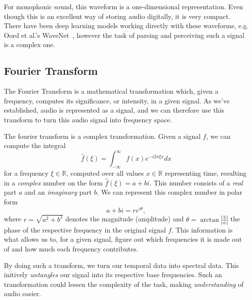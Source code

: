 For monophonic sound, this waveform is a one-dimensional representation. Even though this is an excellent way of storing audio digitally, it is very compact. There have been deep learning models working directly with these waveforms, e.g. Oord et al.'s WaveNet~\cite{oord2016wavenetgenerativemodelraw}, however the task of parsing and perceiving such a signal is a complex one.

\subsection{Fourier Transform}

The Fourier Transform is a mathematical transformation which, given a frequency, computes its significance, or intensity, in a given signal. As we've established, audio is represented as a signal, and we can therefore use this transform to turn this audio signal into frequency space. 

The fourier transform is a complex transformation. Given a signal $f$, we can compute the integral \[ \widehat{f}(\xi) = \int^{\infty}_{-\infty}{f(x)e^{-i2\pi \xi x} dx} \] for a frequency $\xi \in \mathbb{R}$, computed over all values $x \in \mathbb{R}$ representing time, resulting in a \textit{complex} number on the form $\widehat{f}(\xi) = a + bi$. This number consists of a \textit{real} part $a$ and an \textit{imaginary} part $b$. We can represent this complex number in polar form \[ a + bi = re^{i\theta}, \] where $r = \sqrt{a^2 + b^2}$ denotes the magnitude (amplitude) and $\theta = \arctan{|\frac{b}{a}|}$ the phase of the respective frequency in the original signal $f$. This information is what allows us to, for a given signal, figure out which frequencies it is made out of and how much each frequency contributes. 

By doing such a transform, we turn our temporal data into spectral data. This initively \textit{untangles} our signal into its respective base frequencies. Such an transformation could lessen the complexity of the task, making \textit{understanding} of audio easier.

